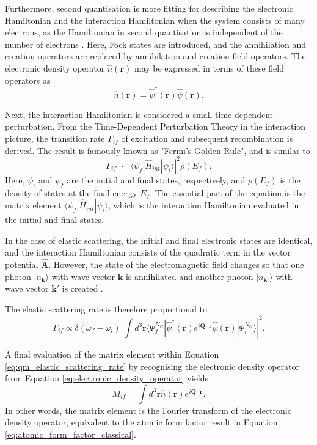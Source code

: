 Furthermore, second quantisation is more fitting for describing the electronic Hamiltonian and the interaction Hamiltonian when the system consists of many electrons, as the Hamiltonian in second quantisation is independent of the number of electrons \cite{rohringer2020introduction}.
Here, Fock states are introduced, and the annihilation and creation operators are replaced by annihilation and creation field operators.
The electronic density operator $\widehat{n}(\bm{r})$ may be expressed in terms of these field operators as
\begin{equation}\label{eq:electronic_density_operator}
    \widehat{n}(\bm{r}) =  \hat{\psi}^{\dagger}(\bm{r}) \hat{\psi}( \bm{r}).
\end{equation}

Next, the interaction Hamiltonian is considered a small time-dependent perturbation.
From the Time-Dependent Perturbation Theory in the interaction picture, the transition rate $\Gamma_{if}$ of excitation and subsequent recombination is derived.
The result is famously known as "Fermi's Golden Rule", and is similar to
\begin{equation}\label{eq:fermis_golden_rule}
    \Gamma_{if} \sim \left| \langle \psi_{f} | \hat{H}_{int} | \psi_{i} \rangle \right|^{2} \rho(E_{f}).
\end{equation}
Here, $\psi_{i}$ and $\psi_{f}$ are the initial and final states, respectively, and $\rho(E_{f})$ is the density of states at the final energy $E_{f}$.
The essential part of the equation is the matrix element $\langle \psi_{f} | \hat{H}_{int} | \psi_{i} \rangle$, which is the interaction Hamiltonian evaluated in the initial and final states.

In the case of elastic scattering, the initial and final electronic states are identical, and the interaction Hamiltonian consists of the quadratic term in the vector potential $\bm{\widehat{A}}$.
However, the state of the electromagnetic field changes so that one photon $\vert n_{\bm{k}}\rangle$ with wave vector $\bm{k}$ is annihilated and another photon $\vert n_{\bm{k'}}\rangle$ with wave vector $\bm{k'}$ is created \cite{mcmorrow2011elements}.

The elastic scattering rate is therefore proportional to
\begin{equation}\label{eq:qm_elastic_scattering_rate}
    \Gamma_{if} \propto \delta \left( \omega_{f} - \omega_{i} \right) \left| \int d^{3}\bm{r} \langle  \Psi_{f}^{N_{el}} | \hat{\psi}^{\dagger}(\bm{r}) e^{i \bm{Q} \cdot \bm{r} } \hat{\psi}( \bm{r})  | \Psi_{i}^{N_{el}} \rangle \right|^{2}.
\end{equation}

A final evaluation of the matrix element within Equation \eqref{eq:qm_elastic_scattering_rate} by recognising the electronic density operator from Equation \eqref{eq:electronic_density_operator} yields
\begin{equation}
    M_{if} = \int d^{3}\bm{r} \left. \widehat{n}(\bm{r}) e^{i \bm{Q} \cdot \bm{r}} \right. .
\end{equation}
In other words, the matrix element is the Fourier transform of the electronic density operator, equivalent to the atomic form factor result in Equation \eqref{eq:atomic_form_factor_classical}.


